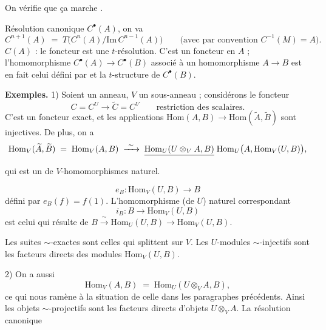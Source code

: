 \documentclass[11pt,a4paper]{article}
\begin{document}

On vérifie que ça marche \ill{}.

Résolution canonique $C^{\bullet}(A)$, \ill{} on va \ill{}
\[
  C^{n+1}(A) \;=\; T\bigl( C^{n}(A) / \mathrm{Im}\, C^{n-1}(A) \bigr)
  \qquad \text{(avec par convention } C^{-1}(M) = A\text{)} .
\]
 $C(A)$ : le foncteur \ill{} est une $t$-résolution.
C'est un foncteur en $A$ ; l'homomorphisme $C^{\bullet}(A) \to C^{\bullet}(B)$
associé à un homomorphisme $A \to B$ est en fait celui défini par \ill{} et la
$t$-structure de $C^{\bullet}(B)$.


\textbf{Exemples.} 1) Soient  un anneau, $V$ un sous-anneau ;
considérons le foncteur
\[
  C = C^{U} \longrightarrow \widetilde{C} = C^{V}
  \qquad \text{restriction des scalaires.}
\]
C'est un foncteur exact, et les applications
$\mathrm{Hom}(A,B) \to \mathrm{Hom}(\widetilde{A}, \widetilde{B})$ sont
injectives. De plus, on a
\[
  \mathrm{Hom}_{V}(\widetilde{A}, \widetilde{B})
  \;=\; \mathrm{Hom}_{V}(A, B)
  \;\xrightarrow{\ \sim\ }\;
  \struck{\mathrm{Hom}_{U}(U \otimes_{V} A, B)}\;
  \mathrm{Hom}_{U}\bigl( A, \mathrm{Hom}_{V}(U, B) \bigr) ,
\]
qui est  un \ill{} de $V$-homomorphismes naturel.

\[
  e_B : \mathrm{Hom}_{V}(U, B) \longrightarrow B
\]
défini par $e_B(f) = f(1)$. L'homomorphisme (de $U$) naturel correspondant
\[
  i_B : B \longrightarrow \mathrm{Hom}_{V}(U, B)
\]
est celui qui résulte de
$B \xrightarrow{\ \sim\ } \mathrm{Hom}_{U}(U,B) \to \mathrm{Hom}_{V}(U,B)$.

Les suites $\sim$-exactes sont celles qui splittent sur $V$. Les $U$-modules
$\sim$-injectifs sont les facteurs directs des modules
$\mathrm{Hom}_{V}(U, B)$.

2) On a aussi
\[
  \mathrm{Hom}_{V}(A, B) \;=\; \mathrm{Hom}_{U}(U \otimes_{V} A, B) ,
\]
ce qui nous ramène à la situation  de celle
 dans les paragraphes précédents. Ainsi les objets
$\sim$-projectifs sont les facteurs directs d'objets $U \otimes_{V} A$. La
résolution canonique \ill{}
\end{document}
